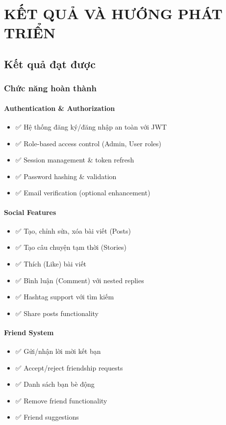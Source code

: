 \chapter{KẾT QUẢ VÀ HƯỚNG PHÁT TRIỂN}

\section{Kết quả đạt được}

\subsection{Chức năng hoàn thành}

\subsubsection{Authentication \& Authorization}
\begin{itemize}
    \item ✅ Hệ thống đăng ký/đăng nhập an toàn với JWT
    \item ✅ Role-based access control (Admin, User roles)
    \item ✅ Session management \& token refresh
    \item ✅ Password hashing \& validation
    \item ✅ Email verification (optional enhancement)
\end{itemize}

\subsubsection{Social Features}
\begin{itemize}
    \item ✅ Tạo, chỉnh sửa, xóa bài viết (Posts)
    \item ✅ Tạo câu chuyện tạm thời (Stories)
    \item ✅ Thích (Like) bài viết
    \item ✅ Bình luận (Comment) với nested replies
    \item ✅ Hashtag support với tìm kiếm
    \item ✅ Share posts functionality
\end{itemize}

\subsubsection{Friend System}
\begin{itemize}
    \item ✅ Gửi/nhận lời mời kết bạn
    \item ✅ Accept/reject friendship requests
    \item ✅ Danh sách bạn bè động
    \item ✅ Remove friend functionality
    \item ✅ Friend suggestions
\end{itemize}

